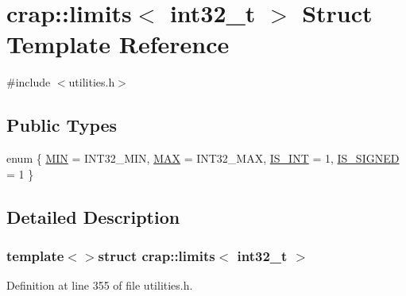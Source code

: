 \hypertarget{structcrap_1_1limits_3_01int32__t_01_4}{\section{crap\+:\+:limits$<$ int32\+\_\+t $>$ Struct Template Reference}
\label{structcrap_1_1limits_3_01int32__t_01_4}
}


{\ttfamily \#include $<$utilities.\+h$>$}

\subsection*{Public Types}
\begin{DoxyCompactItemize}
\item 
enum \{ \hyperlink{structcrap_1_1limits_3_01int32__t_01_4_afa004d2c265fa2323ca9a5a56981da20a38dc1df75abcbe660a6b95482164241a}{M\+I\+N} = I\+N\+T32\+\_\+\+M\+I\+N, 
\hyperlink{structcrap_1_1limits_3_01int32__t_01_4_afa004d2c265fa2323ca9a5a56981da20a0cadb85e49c844a9793962df51e64147}{M\+A\+X} = I\+N\+T32\+\_\+\+M\+A\+X, 
\hyperlink{structcrap_1_1limits_3_01int32__t_01_4_afa004d2c265fa2323ca9a5a56981da20adfcf8fb95d67edb7b835681a18ce0949}{I\+S\+\_\+\+I\+N\+T} = 1, 
\hyperlink{structcrap_1_1limits_3_01int32__t_01_4_afa004d2c265fa2323ca9a5a56981da20a181802a9b60de9f8d0bd62f5b02124bd}{I\+S\+\_\+\+S\+I\+G\+N\+E\+D} = 1
 \}
\end{DoxyCompactItemize}


\subsection{Detailed Description}
\subsubsection*{template$<$$>$struct crap\+::limits$<$ int32\+\_\+t $>$}



Definition at line 355 of file utilities.\+h.



